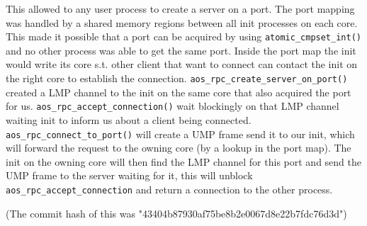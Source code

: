 This allowed to any user process to create a server on a port. The port mapping was handled by a shared memory regions between all init processes on each core. This made it possible that a port can be acquired by using \texttt{atomic_cmpset_int()} and no other process was able to get the same port. Inside the port map the init would write its core s.t. other client that want to connect can contact the init on the right core to establish the connection. \texttt{aos_rpc_create_server_on_port()} created a LMP channel to the init on the same core that also acquired the port for us. \texttt{aos_rpc_accept_connection()} wait blockingly on that LMP channel waiting init to inform us about a client being connected.  \texttt{aos_rpc_connect_to_port()} will create a UMP frame send it to our init, which will forward the request to the owning core (by a lookup in the port map). The init on the owning core will then find the LMP channel for this port and send the UMP frame to the server waiting for it, this will unblock \texttt{aos_rpc_accept_connection} and return a connection to the other process.

(The commit hash of this was "43404b87930af75be8b2e0067d8e22b7fdc76d3d")
